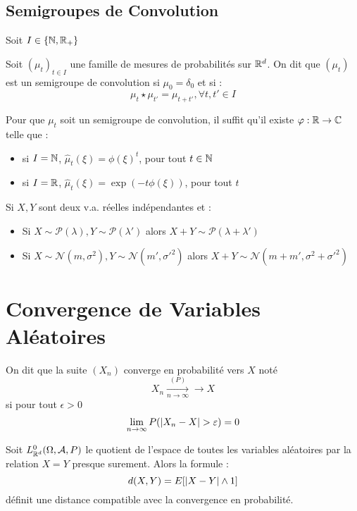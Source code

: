 \documentclass{cours}
\begin{document}
\subsection{Semigroupes de Convolution}
Soit $I \in \left\{\mathbb{N}, \mathbb{R}_{+}\right\}$
\begin{definition}
    Soit $(\mu_{t})_{t\in I}$ une famille de mesures de probabilités sur $\mathbb{R}^{d}$. On dit que $\left(\mu_{t}\right)$ est un semigroupe de convolution si $\mu_{0} = \delta_{0}$ et si : 
    \[
        \mu_{t} \star \mu_{t'} = \mu_{t + t'}, \forall t, t' \in I
    \]
\end{definition}
\begin{lemma}
    Pour que $\mu_{t}$ soit un semigroupe de convolution, il suffit qu'il existe $\varphi : \mathbb{R} \rightarrow \mathbb{C}$ telle que : 
    \begin{itemize}
        \item si $I = \mathbb{N}$, $\hat{\mu}_{t}(\xi) = \phi(\xi)^{t}$, pour tout $t \in \mathbb{N}$
        \item si $I = \mathbb{R}$, $\hat{\mu}_{t}(\xi) = \exp(-t\phi(\xi))$, pour tout $t$
    \end{itemize}
\end{lemma}
\begin{proposition}
    Si $X, Y$ sont deux v.a. réelles indépendantes et : 
    \begin{itemize}
        \item Si $X \sim \mathcal{P}(\lambda), Y \sim \mathcal{P}(\lambda')$ alors $X + Y \sim \mathcal{P}(\lambda + \lambda')$
        \item Si $X \sim \mathcal{N}(m, \sigma^2), Y \sim \mathcal{N}(m', \sigma'^{2})$ alors $X + Y \sim \mathcal{N}(m + m', \sigma^{2} + \sigma'^{2})$
    \end{itemize}
\end{proposition}

\section{Convergence de Variables Aléatoires}
\begin{definition}
    On dit que la suite $(X_{n})$ converge en probabilité vers $X$ noté 
    \[
        X_{n} \xrightarrow[n \to \infty]{(P)} \rightarrow X
    \]
    si pour tout $\epsilon > 0$ 
    \[
        \lim_{n \to \infty} P(\left|X_{n} - X\right| > \varepsilon) = 0
    \]
\end{definition}

\begin{proposition}
    Soit $L_{\mathbb{R}^{d}}^{0}(\Omega, \mathcal{A}, P)$ le quotient de l'espace de toutes les variables aléatoires par la relation $X = Y$ presque surement. Alors la formule : 
    \[
        d(X, Y) = E[\left|X - Y\right| \land 1]
    \]
    définit une distance compatible avec la convergence en probabilité. 
\end{proposition}
\end{document}
